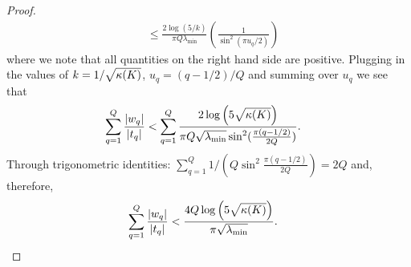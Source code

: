 \begin{proof}
\begin{align*}
    &\leq \frac{2\log( 5 / k)}{\pi Q \lambda_{\min}}\left(\frac{1}{\sin^2( \pi u_q /2 )} \right)
  \end{align*}
  where we note that all quantities on the right hand side are positive.
  Plugging in the values of $k = 1/\sqrt{\kappa{(\ensuremath{K})}}$, $u_q = (q-1/2)/Q$ and summing over $u_q$ we see that
  \begin{align}
    \sum_{q=1}^Q \frac{|w_q|}{|t_q|}
    &<
    \sum_{q=1}^Q \frac{ 2 \log \left( 5 \sqrt{\kappa(K)} \right)}
    { \pi Q \sqrt{\lambda_\text{min}} \sin^2 ( \frac{\pi (q - 1/2)}{2Q}) }.
  \end{align}
  Through trigonometric identities:
  $\sum_{q=1}^Q 1 / ( Q \sin^2 \frac{\pi(q- 1/2 )}{2Q} )  = 2 Q$ and, therefore,
  \begin{align*}
    \sum_{q=1}^Q \frac{|w_q|}{|t_q|}
    &< \frac{4 Q \log \left( 5 \sqrt{\kappa(K)} \right)}{\pi \sqrt{\lambda_\text{min}}}.
  \end{align*}
\end{proof}







